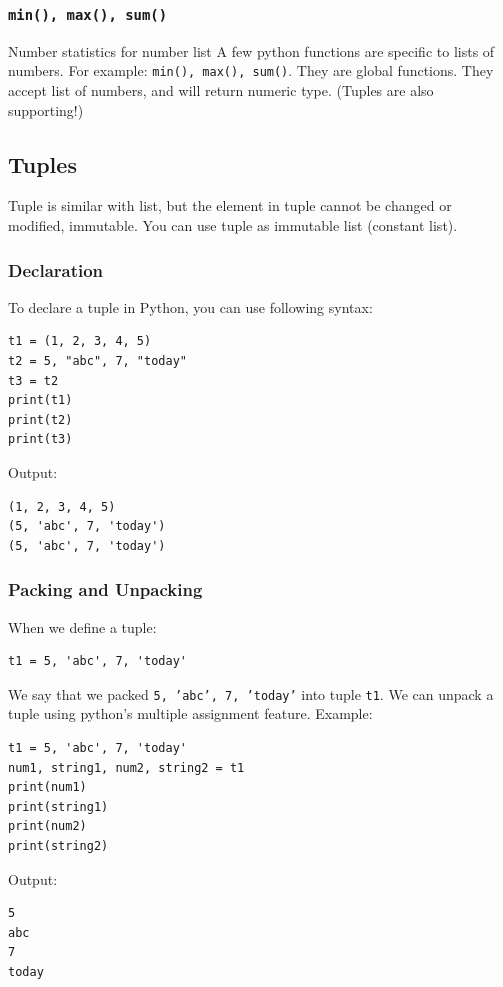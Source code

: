 \documentclass[12pt]{book}
\begin{document}
\subsubsection{\texttt{min(), max(), sum()}}
\label{sec:org1140338}
Number statistics for number list
A few python functions are specific to lists of numbers. For example: \texttt{min(), max(), sum()}. They are global functions. They accept list of numbers, and will return numeric type. (Tuples are also supporting!)

\subsection{Tuples}
\label{sec:org396d2dc}
Tuple is similar with list, but the element in tuple cannot be changed or modified, immutable. You can use tuple as immutable list (constant list).
\subsubsection{Declaration}
\label{sec:org9bee1f5}
To declare a tuple in Python, you can use following syntax:
\begin{verbatim}
t1 = (1, 2, 3, 4, 5)
t2 = 5, "abc", 7, "today"
t3 = t2
print(t1)
print(t2)
print(t3)
\end{verbatim}
Output:
\begin{verbatim}
(1, 2, 3, 4, 5)
(5, 'abc', 7, 'today')
(5, 'abc', 7, 'today')
\end{verbatim}
\subsubsection{Packing and Unpacking}
\label{sec:org4c5083f}
When we define a tuple:
\begin{verbatim}
t1 = 5, 'abc', 7, 'today'
\end{verbatim}
We say that we packed \texttt{5, 'abc', 7, 'today'} into tuple \texttt{t1}. We can unpack a tuple using python's multiple assignment feature. Example:
\begin{verbatim}
t1 = 5, 'abc', 7, 'today'
num1, string1, num2, string2 = t1
print(num1)
print(string1)
print(num2)
print(string2)
\end{verbatim}
Output:
\begin{verbatim}
5
abc
7
today
\end{verbatim}
\end{document}
